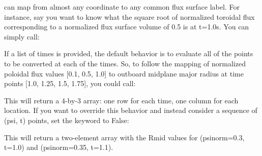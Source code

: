 \documentclass[letterpaper,10pt,english]{sphinxmanual}
\begin{document}
{\hyperref[\detokenize{eqtools:module-eqtools}]{}} can map from almost any coordinate to any common flux surface label. For instance, say you want to know what the square root of normalized toroidal flux corresponding to a normalized flux surface volume of 0.5 is at t=1.0s. You can simply call:

\begin{sphinxVerbatim}[commandchars=\\\{\}]
    
\end{sphinxVerbatim}

If a list of times is provided, the default behavior is to evaluate all of the points to be converted at each of the times. So, to follow the mapping of normalized poloidal flux values {[}0.1, 0.5, 1.0{]} to outboard midplane major radius at time points {[}1.0, 1.25, 1.5, 1.75{]}, you could call:

\begin{sphinxVerbatim}[commandchars=\\\{\}]
  \PYG{p}{[}  \PYG{p}{]} \PYG{p}{[}   \PYG{p}{]}
\end{sphinxVerbatim}

This will return a 4-by-3 array: one row for each time, one column for each location. If you want to override this behavior and instead consider a sequence of (psi, t) points, set the  keyword to False:

\begin{sphinxVerbatim}[commandchars=\\\{\}]
  \PYG{p}{[} \PYG{p}{]} \PYG{p}{[} \PYG{p}{]} 
\end{sphinxVerbatim}

This will return a two-element array with the Rmid values for (psinorm=0.3, t=1.0) and (psinorm=0.35, t=1.1).
\end{document}
